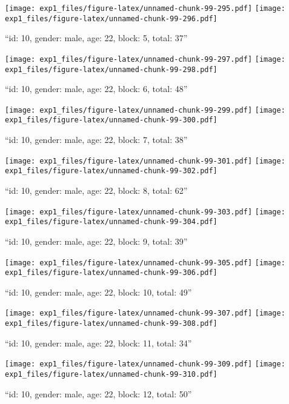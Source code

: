 \documentclass[,]{article}
\begin{document}
\texttt{[image: exp1\_files/figure-latex/unnamed-chunk-99-295.pdf]}
\texttt{[image: exp1\_files/figure-latex/unnamed-chunk-99-296.pdf]}

\newpage
[1] 

``id: 10, gender: male, age: 22, block: 5, total: 37''

\texttt{[image: exp1\_files/figure-latex/unnamed-chunk-99-297.pdf]}
\texttt{[image: exp1\_files/figure-latex/unnamed-chunk-99-298.pdf]}

\newpage
[1] 

``id: 10, gender: male, age: 22, block: 6, total: 48''

\texttt{[image: exp1\_files/figure-latex/unnamed-chunk-99-299.pdf]}
\texttt{[image: exp1\_files/figure-latex/unnamed-chunk-99-300.pdf]}

\newpage
[1] 

``id: 10, gender: male, age: 22, block: 7, total: 38''

\texttt{[image: exp1\_files/figure-latex/unnamed-chunk-99-301.pdf]}
\texttt{[image: exp1\_files/figure-latex/unnamed-chunk-99-302.pdf]}

\newpage
[1] 

``id: 10, gender: male, age: 22, block: 8, total: 62''

\texttt{[image: exp1\_files/figure-latex/unnamed-chunk-99-303.pdf]}
\texttt{[image: exp1\_files/figure-latex/unnamed-chunk-99-304.pdf]}

\newpage
[1] 

``id: 10, gender: male, age: 22, block: 9, total: 39''

\texttt{[image: exp1\_files/figure-latex/unnamed-chunk-99-305.pdf]}
\texttt{[image: exp1\_files/figure-latex/unnamed-chunk-99-306.pdf]}

\newpage
[1] 

``id: 10, gender: male, age: 22, block: 10, total: 49''

\texttt{[image: exp1\_files/figure-latex/unnamed-chunk-99-307.pdf]}
\texttt{[image: exp1\_files/figure-latex/unnamed-chunk-99-308.pdf]}

\newpage
[1] 

``id: 10, gender: male, age: 22, block: 11, total: 34''

\texttt{[image: exp1\_files/figure-latex/unnamed-chunk-99-309.pdf]}
\texttt{[image: exp1\_files/figure-latex/unnamed-chunk-99-310.pdf]}

\newpage
[1] 

``id: 10, gender: male, age: 22, block: 12, total: 50''
\end{document}
